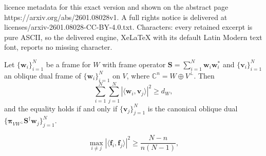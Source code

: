 \documentclass[10pt,a4paper]{amsart}
\newcommand{\bpi}{{\boldsymbol{\pi}}}
\begin{document}
licence metadata for this exact version and shown on the abstract page https://arxiv.org/abs/2601.08028v1. A full rights notice is delivered at licenses/arxiv-2601.08028-CC-BY-4.0.txt. Characters: every retained excerpt is pure ASCII, so the delivered engine, XeLaTeX with its default Latin Modern text font, reports no missing character.
\begin{proposition}\label{lemma:oblique_dual_potential}
    Let $\{\mathbf{w}_i\}_{i=1}^N$ be a frame for $W$ with frame operator $ \mathbf{S} = \sum_{i=1}^N \mathbf{w}_i\mathbf{w}_i^*$ and $\{\mathbf{v}_i\}_{i=1}^N$ an oblique dual frame of $\{\mathbf{w}_i\}_{i=1}^N$ on $V$, where $\mathbb{C}^n = W \oplus V^\perp$. Then 
    \begin{equation*}
         \sum_{i=1}^N \sum_{j=1}^N |\langle \mathbf{w}_i, \mathbf{v}_j \rangle |^2 \geq d_W,
    \end{equation*}
and the equality holds if and only if $\{\mathbf{v}_j\}_{j=1}^N$ is the canonical oblique dual $\{\bpi_{VW^\perp} \mathbf{S}^{\dagger} \mathbf{w}_j\}_{j=1}^N$. 
\end{proposition}

\begin{equation}\label{eq:welch}
    \max_{i \neq j} |\langle \mathbf{f}_i, \mathbf{f}_j \rangle|^2 
    \geq \frac{N-n}{n(N-1)},
\end{equation}
\end{document}
